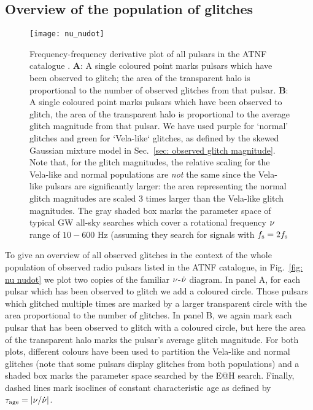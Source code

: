 \documentclass[../full_thesis/full_thesis.tex]{subfiles}
\begin{document}
\subsection{Overview of the population of glitches}
\label{sec: overview of the population of glitches}
\begin{figure*}[htb]
\centering
\texttt{[image: nu\_nudot]}
\caption{Frequency-frequency derivative plot of all pulsars in the ATNF
catalogue \citep{ATNF}. \textbf{A}: A single coloured point marks pulsars which have been
observed to glitch; the area of the transparent halo is proportional to the
number of observed glitches from that pulsar. \textbf{B}: A single coloured
point marks pulsars which have been observed to glitch, the area of the transparent
halo is proportional to the average glitch magnitude from that pulsar. We have used
purple for `normal' glitches and green for `Vela-like` glitches, as defined by
the skewed Gaussian mixture model in Sec.~\ref{sec: observed glitch magnitude}. Note
that, for the glitch magnitudes, the relative scaling for the Vela-like and
normal populations are \emph{not}
the same since the Vela-like pulsars are significantly larger: the area representing
the normal glitch magnitudes are scaled 3 times larger than the Vela-like glitch
magnitudes.
The gray shaded box marks the parameter space of typical GW all-sky searches which
cover a rotational frequency $\nu$ range of $10-600$ Hz (assuming they search for signals
with $f_{\textrm{s}}=2f_{\textrm{s}}$}
\label{fig: nu nudot}
\end{figure*}

To give an overview of all observed glitches in the context of the whole population of
observed radio pulsars listed in the ATNF catalogue, in Fig.~\ref{fig: nu
nudot} we plot two copies of the familiar $\nu$-$\dot{\nu}$ diagram. In panel A, for each
pulsar which has been observed to glitch we add a coloured circle. Those
pulsars which glitched multiple times are marked by a larger transparent circle
with the area proportional to the number of glitches. In panel B, we again mark
each pulsar that has been observed to glitch with a coloured circle, but here
the area of the transparent halo marks the pulsar's average glitch magnitude.
For both plots, different
colours have been used to partition the Vela-like and normal glitches (note that some
pulsars display glitches from both populations) and a shaded box marks the
parameter space searched by the E@H search. Finally, dashed lines mark isoclines
of constant characteristic age as defined by $\tau_{\mathrm{age}} = \left|\nu/\dot{\nu}\right|$.
\end{document}
